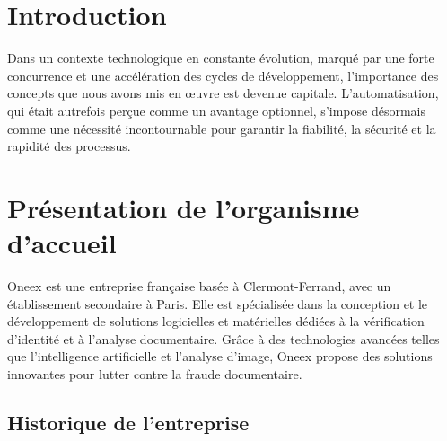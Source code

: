\section{Introduction}

Dans un contexte technologique en constante évolution, marqué par une forte concurrence et une accélération des cycles de développement, l’importance des concepts que nous avons mis en œuvre est devenue capitale. L’automatisation, qui était autrefois perçue comme un avantage optionnel, s’impose désormais comme une nécessité incontournable pour garantir la fiabilité, la sécurité et la rapidité des processus.

\section{Présentation de l'organisme d'accueil}

Oneex est une entreprise française basée à Clermont-Ferrand, avec un établissement secondaire à Paris. Elle est spécialisée dans la conception et le développement de solutions logicielles et matérielles dédiées à la vérification d’identité et à l’analyse documentaire. Grâce à des technologies avancées telles que l’intelligence artificielle et l’analyse d’image, Oneex propose des solutions innovantes pour lutter contre la fraude documentaire.

\subsection{Historique de l’entreprise}

